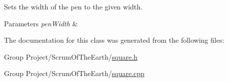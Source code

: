 Sets the width of the pen to the given width. 


\begin{DoxyParams}{Parameters}
{\em pen\+Width} & \\
\hline
\end{DoxyParams}


The documentation for this class was generated from the following files\+:\begin{DoxyCompactItemize}
\item 
Group Project/\+Scrum\+Of\+The\+Earth/\hyperlink{square_8h}{square.\+h}\item 
Group Project/\+Scrum\+Of\+The\+Earth/\hyperlink{square_8cpp}{square.\+cpp}\end{DoxyCompactItemize}
